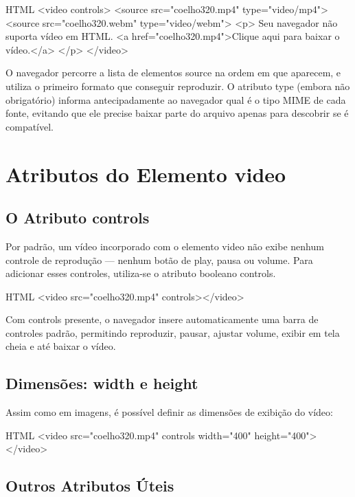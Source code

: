 \begin{codebox}{HTML}
<video controls>
  <source src="coelho320.mp4" type="video/mp4">
  <source src="coelho320.webm" type="video/webm">
  <p>
    Seu navegador não suporta vídeo em HTML.
    <a href="coelho320.mp4">Clique aqui para baixar o vídeo.</a>
  </p>
</video>
\end{codebox}

O navegador percorre a lista de elementos source na ordem em que aparecem, e utiliza o primeiro formato que conseguir reproduzir. O atributo type (embora não obrigatório) informa antecipadamente ao navegador qual é o tipo MIME de cada fonte, evitando que ele precise baixar parte do arquivo apenas para descobrir se é compatível.

\section{Atributos do Elemento video}

\subsection{O Atributo controls}

Por padrão, um vídeo incorporado com o elemento video não exibe nenhum controle de reprodução — nenhum botão de play, pausa ou volume. Para adicionar esses controles, utiliza-se o atributo booleano controls.

\begin{codebox}{HTML}
<video src="coelho320.mp4" controls></video>
\end{codebox}

Com controls presente, o navegador insere automaticamente uma barra de controles padrão, permitindo reproduzir, pausar, ajustar volume, exibir em tela cheia e até baixar o vídeo.

\subsection{Dimensões: width e height}

Assim como em imagens, é possível definir as dimensões de exibição do vídeo:

\begin{codebox}{HTML}
<video src="coelho320.mp4" controls width="400" height="400"></video>
\end{codebox}

\subsection{Outros Atributos Úteis}

